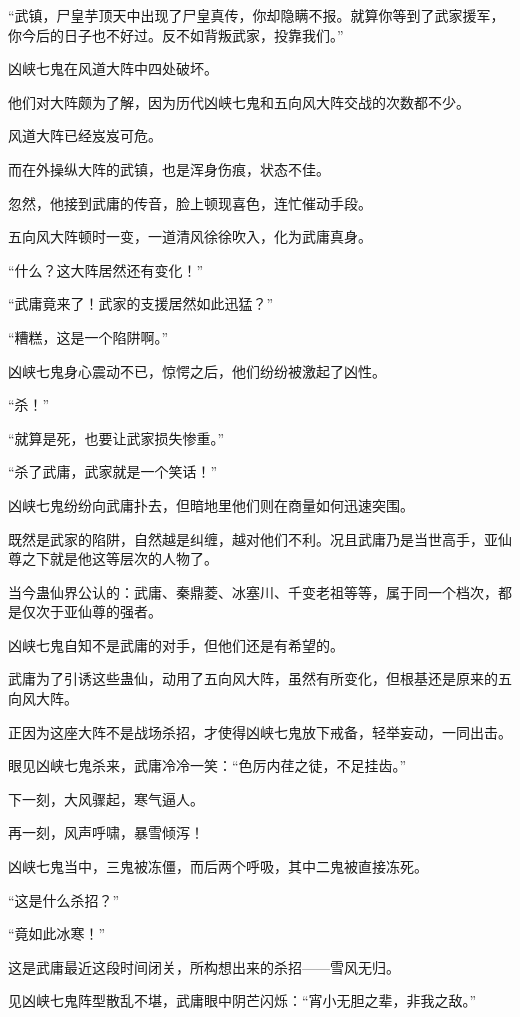 \begin{this_body}
“武镇，尸皇芋顶天中出现了尸皇真传，你却隐瞒不报。就算你等到了武家援军，你今后的日子也不好过。反不如背叛武家，投靠我们。”

凶峡七鬼在风道大阵中四处破坏。

他们对大阵颇为了解，因为历代凶峡七鬼和五向风大阵交战的次数都不少。

风道大阵已经岌岌可危。

而在外操纵大阵的武镇，也是浑身伤痕，状态不佳。

忽然，他接到武庸的传音，脸上顿现喜色，连忙催动手段。

五向风大阵顿时一变，一道清风徐徐吹入，化为武庸真身。

“什么？这大阵居然还有变化！”

“武庸竟来了！武家的支援居然如此迅猛？”

“糟糕，这是一个陷阱啊。”

凶峡七鬼身心震动不已，惊愕之后，他们纷纷被激起了凶性。

“杀！”

“就算是死，也要让武家损失惨重。”

“杀了武庸，武家就是一个笑话！”

凶峡七鬼纷纷向武庸扑去，但暗地里他们则在商量如何迅速突围。

既然是武家的陷阱，自然越是纠缠，越对他们不利。况且武庸乃是当世高手，亚仙尊之下就是他这等层次的人物了。

当今蛊仙界公认的：武庸、秦鼎菱、冰塞川、千变老祖等等，属于同一个档次，都是仅次于亚仙尊的强者。

凶峡七鬼自知不是武庸的对手，但他们还是有希望的。

武庸为了引诱这些蛊仙，动用了五向风大阵，虽然有所变化，但根基还是原来的五向风大阵。

正因为这座大阵不是战场杀招，才使得凶峡七鬼放下戒备，轻举妄动，一同出击。

眼见凶峡七鬼杀来，武庸冷冷一笑：“色厉内荏之徒，不足挂齿。”

下一刻，大风骤起，寒气逼人。

再一刻，风声呼啸，暴雪倾泻！

凶峡七鬼当中，三鬼被冻僵，而后两个呼吸，其中二鬼被直接冻死。

“这是什么杀招？”

“竟如此冰寒！”

这是武庸最近这段时间闭关，所构想出来的杀招——雪风无归。

见凶峡七鬼阵型散乱不堪，武庸眼中阴芒闪烁：“宵小无胆之辈，非我之敌。”


\end{this_body}
